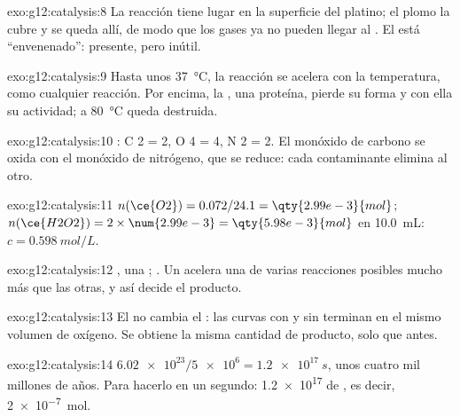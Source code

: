\begin{solution}{exo:g12:catalysis:8}
La reacción tiene lugar en la superficie del platino; el plomo la cubre y
se queda allí, de modo que los gases ya no pueden llegar al . El
 está ``envenenado'': presente, pero inútil.
\end{solution}

\begin{solution}{exo:g12:catalysis:9}
Hasta unos \qty{37}{\celsius}, la reacción se acelera con la
temperatura, como cualquier reacción. Por encima, la , una
proteína, pierde su forma y con ella su actividad; a \qty{80}{\celsius}
queda destruida.
\end{solution}

\begin{solution}{exo:g12:catalysis:10}
: C 2 = 2, O 4 = 4, N 2 = 2. El monóxido de
carbono se oxida con el monóxido de nitrógeno, que se reduce: cada
contaminante elimina al otro.
\end{solution}

\begin{solution}{exo:g12:catalysis:11}
$n(\ce{O2}) = 0.072 / 24.1 = \qty{2.99e-3}{mol}$;
$n(\ce{H2O2}) = 2 \times \num{2.99e-3} = \qty{5.98e-3}{mol}$ en
\qty{10.0}{mL}: $c = \qty{0.598}{mol/L}$.
\end{solution}

\begin{solution}{exo:g12:catalysis:12}
, una ; .
Un  acelera una de varias reacciones posibles mucho
más que las otras, y así decide el producto.
\end{solution}

\begin{solution}{exo:g12:catalysis:13}
El  no cambia el : las curvas con y sin
 terminan en el mismo volumen de oxígeno. Se obtiene la misma
cantidad de producto, solo que antes.
\end{solution}

\begin{solution}{exo:g12:catalysis:14}
$\num{6.02e23} / \num{5e6} = \qty{1.2e17}{s}$, unos cuatro mil millones
de años. Para hacerlo en un segundo: \num{1.2e17}  de , es
decir, \qty{2e-7}{mol}.
\end{solution}

